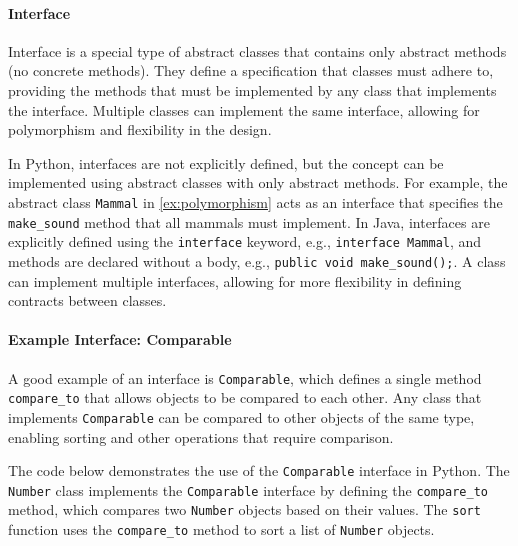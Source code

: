 \documentclass[oneside,11pt,dvipsnames]{book}
\newcommand{\code}[1]{\texttt{#1}}
\begin{document}
\paragraph{Interface}

Interface is a special type of abstract classes that contains only abstract methods (no concrete methods). They define a specification that classes must adhere to, providing the methods that must be implemented by any class that implements the interface. Multiple classes can implement the same interface, allowing for polymorphism and flexibility in the design.

In Python, interfaces are not explicitly defined, but the concept can be implemented using abstract classes with only abstract methods. For example, the abstract class \code{Mammal} in \autoref{ex:polymorphism} acts as an interface that specifies the \code{make\_sound} method that all mammals must implement.
In Java, interfaces are explicitly defined using the \code{interface} keyword, e.g., \code{interface Mammal}, and methods are declared without a body, e.g., \code{public void make\_sound();}. A class can implement multiple interfaces, allowing for more flexibility in defining contracts between classes.


\paragraph{Example Interface: Comparable} A good example of an interface is \code{Comparable}, which defines a single method \code{compare\_to} that allows objects to be compared to each other. Any class that implements \code{Comparable} can be compared to other objects of the same type, enabling sorting and other operations that require comparison.

The code below demonstrates the use of the \code{Comparable} interface in Python. The \code{Number} class implements the \code{Comparable} interface by defining the \code{compare\_to} method, which compares two \code{Number} objects based on their values. The \code{sort} function uses the \code{compare\_to} method to sort a list of \code{Number} objects.
\end{document}
